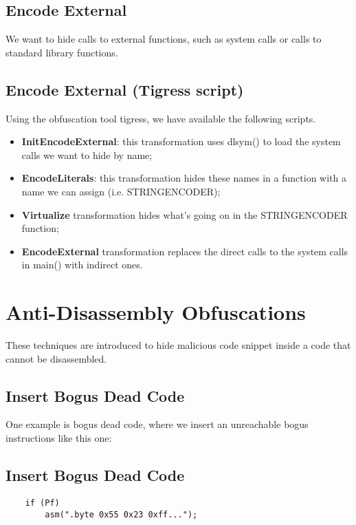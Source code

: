 \subsection{Encode External}
We want to hide calls to external functions, such as system calls or calls to standard library functions. 

\subsection{Encode External (Tigress script)}
Using the obfuscation tool tigress, we have available the following scripts. 
\begin{itemize}
    \item \textbf{InitEncodeExternal}: this transformation uses dlsym() to load the system calls we want to hide by name;
    \item \textbf{EncodeLiterals}: this transformation hides these names in a function with a name we can assign (i.e. STRINGENCODER);
    \item \textbf{Virtualize} transformation hides what's going on in the STRINGENCODER function;
    \item \textbf{EncodeExternal} transformation replaces the direct calls to the system calls in main() with indirect ones. 
    
\end{itemize}

\section{Anti-Disassembly Obfuscations}

These techniques are introduced to hide malicious code snippet inside a code that cannot be disassembled.

\subsection{Insert Bogus Dead Code}

One example is bogus dead code, where we insert an unreachable bogus instructions like this one: 

\subsection{Insert Bogus Dead Code}
\begin{lstlisting}
    if (Pf)
        asm(".byte 0x55 0x23 0xff...");
\end{lstlisting}

